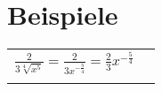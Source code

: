 \documentclass[../main.tex]{subfiles}
\begin{document}
\section{Beispiele}

\begin{tabularx}{1\textwidth} { 
    >{\centering\arraybackslash}X 
    >{\centering\arraybackslash}X  }
    \begin{math}
       \frac{2}{3\sqrt[4]{x^5}} = \frac{2}{3x^{-\frac{5}{4}}} = \frac{2}{3}x^{-\frac{5}{4}}
    \end{math}
    &
    \begin{math}
        {}
    \end{math}
    \\ [7pt]
    \begin{math}
        {}
    \end{math}
    &
    \begin{math}
        {}
    \end{math}
    \\ [7pt]
\end{tabularx}
\end{document}
